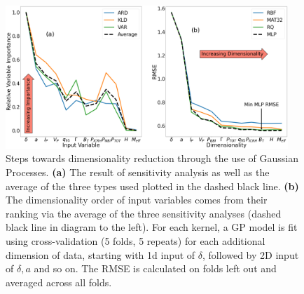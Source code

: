 \documentclass[a4paper, twoside, final, 12pt]{article}
\begin{document}
{\begin{figure}
	\centering
	\includegraphics[width=0.95\textwidth]{./src/GP_sensitivity_analysis_final_v2}
	\caption{Steps towards dimensionality reduction through the use of Gaussian Processes. \textbf{(a)} The result of sensitivity analysis as well as the average of the three types used plotted in the dashed black line. \textbf{(b)} The dimensionality order of input variables comes from their ranking via the average of the three sensitivity analyses (dashed black line in diagram to the left). For each kernel, a GP model is fit using cross-validation (5 folds, 5 repeats) for each additional dimension of data, starting with 1d input of $\delta$, followed by 2D input of $\delta, a$ and so on. The RMSE is calculated on folds left out and averaged across all folds. } \label{fig:GP_dim}


\end{figure}}
\end{document}
